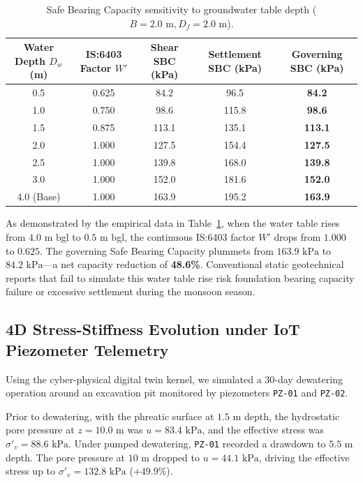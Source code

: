 \documentclass[11pt,a4paper]{article}
\begin{document}
\begin{table}[htbp]
\centering
\caption{Safe Bearing Capacity sensitivity to groundwater table depth ($B = 2.0\text{ m}, D_f = 2.0\text{ m}$).}
\label{tab:sbc_sensitivity}
\begin{tabular}{ccccc}
\toprule
\textbf{Water Depth $D_w$ (m)} & \textbf{IS:6403 Factor $W'$} & \textbf{Shear SBC (kPa)} & \textbf{Settlement SBC (kPa)} & \textbf{Governing SBC (kPa)} \\
\midrule
0.5 & 0.625 & 84.2 & 96.5 & \textbf{84.2} \\
1.0 & 0.750 & 98.6 & 115.8 & \textbf{98.6} \\
1.5 & 0.875 & 113.1 & 135.1 & \textbf{113.1} \\
2.0 & 1.000 & 127.5 & 154.4 & \textbf{127.5} \\
2.5 & 1.000 & 139.8 & 168.0 & \textbf{139.8} \\
3.0 & 1.000 & 152.0 & 181.6 & \textbf{152.0} \\
4.0 (Base) & 1.000 & 163.9 & 195.2 & \textbf{163.9} \\
\bottomrule
\end{tabular}
\end{table}

As demonstrated by the empirical data in Table~\ref{tab:sbc_sensitivity}, when the water table rises from $4.0\text{ m}$ bgl to $0.5\text{ m}$ bgl, the continuous IS:6403 factor $W'$ drops from $1.000$ to $0.625$. The governing Safe Bearing Capacity plummets from $163.9\text{ kPa}$ to $84.2\text{ kPa}$---a net capacity reduction of \textbf{48.6\%}. Conventional static geotechnical reports that fail to simulate this water table rise risk foundation bearing capacity failure or excessive settlement during the monsoon season.

\subsection{4D Stress-Stiffness Evolution under IoT Piezometer Telemetry}

Using the cyber-physical digital twin kernel, we simulated a 30-day dewatering operation around an excavation pit monitored by piezometers \texttt{PZ-01} and \texttt{PZ-02}. 

Prior to dewatering, with the phreatic surface at $1.5\text{ m}$ depth, the hydrostatic pore pressure at $z = 10.0\text{ m}$ was $u = 83.4\text{ kPa}$, and the effective stress was $\sigma'_v = 88.6\text{ kPa}$. Under pumped dewatering, \texttt{PZ-01} recorded a drawdown to $5.5\text{ m}$ depth. The pore pressure at $10\text{ m}$ dropped to $u = 44.1\text{ kPa}$, driving the effective stress up to $\sigma'_v = 132.8\text{ kPa}$ ($+49.9\%$). 
\end{document}
